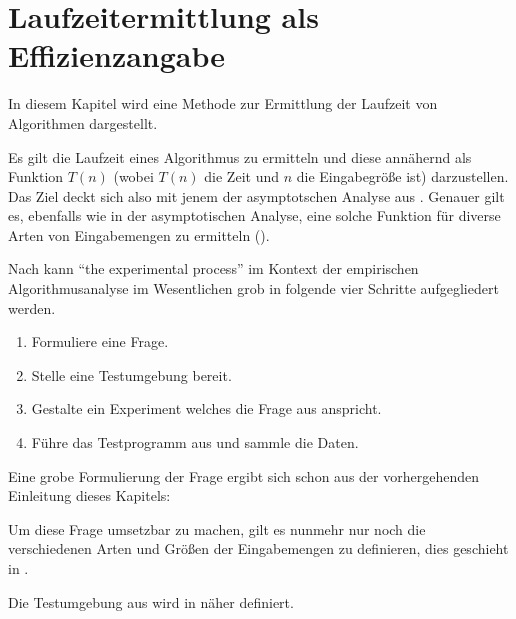 \chapter{Laufzeitermittlung als Effizienzangabe}

In diesem Kapitel wird eine Methode zur Ermittlung der Laufzeit von Algorithmen dargestellt.

Es gilt die Laufzeit eines Algorithmus zu ermitteln und diese annähernd als Funktion $T(n)$ (wobei $T(n)$ die Zeit und $n$ die Eingabegröße ist) darzustellen. Das Ziel deckt sich also mit jenem der asymptotschen Analyse aus . Genauer gilt es, ebenfalls wie in der asymptotischen Analyse, eine solche Funktion für diverse Arten von Eingabemengen zu ermitteln (\cite[27]{mcg2012}).

Nach \cite[10]{mcg2012} kann \enquote{the experimental process} im Kontext der empirischen Algorithmusanalyse im Wesentlichen grob in folgende vier Schritte aufgegliedert werden.

\begin{enumerate}
     \item Formuliere eine Frage.\label{itm:experiment-formulate-question}
     \item Stelle eine Testumgebung bereit.\label{itm:experiment-environment}
     \item Gestalte ein Experiment welches die Frage aus  anspricht.
     \item Führe das Testprogramm aus und sammle die Daten.
 \end{enumerate}

Eine grobe Formulierung der Frage ergibt sich schon aus der vorhergehenden Einleitung dieses Kapitels:


Um diese Frage umsetzbar zu machen, gilt es nunmehr nur noch die verschiedenen Arten und Größen der Eingabemengen zu definieren, dies geschieht in .

Die Testumgebung aus  wird in  näher definiert. 


